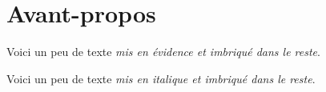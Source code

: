 \section{Avant-propos}
\label{subsec:avant-propos}

Voici un peu de texte \emph{mis en évidence et \emph{imbriqué} dans le reste}.

Voici un peu de texte \textit{mis en italique et \textit{imbriqué} dans le reste}.